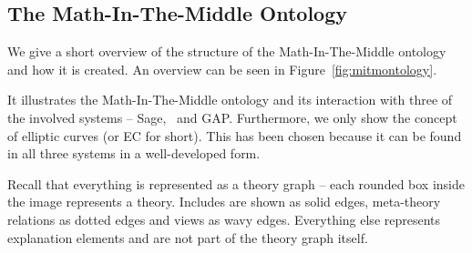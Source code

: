 \subsection{The Math-In-The-Middle Ontology}\label{sec:mitm:ontology}

We give a short overview of the structure of the Math-In-The-Middle ontology and how it is created. 
An overview can be seen in Figure~\ref{fig:mitmontology}. 

It illustrates the Math-In-The-Middle ontology and its interaction with three of the involved systems -- Sage, \lmfdb\ and GAP. 
Furthermore, we only show the concept of elliptic curves (or EC for short). 
This has been chosen because it can be found in all three systems in a well-developed form. 

Recall that everything is represented as a theory graph -- each rounded box inside the image represents a theory. 
Includes are shown as solid edges, meta-theory relations as dotted edges and views as wavy edges. 
Everything else represents explanation elements and are not part of the theory graph itself. 

